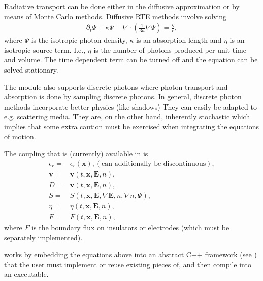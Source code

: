 \documentclass[letterpaper,10pt,english]{sphinxmanual}
\begin{document}
Radiative transport can be done either in the diffusive approximation or by means of Monte Carlo methods.
Diffusive RTE methods involve solving
\begin{equation*}
\begin{split}\partial_t\Psi + \kappa\Psi - \nabla\cdot\left(\frac{1}{3\kappa}\nabla\Psi\right) = \frac{\eta}{c},\end{split}
\end{equation*}
where \(\Psi\) is the isotropic photon density, \(\kappa\) is an absorption length and \(\eta\) is an isotropic source term.
I.e., \(\eta\) is the number of photons produced per unit time and volume.
The time dependent term can be turned off and the equation can be solved stationary.

The module also supports discrete photons where photon transport and absorption is done by sampling discrete photons.
In general, discrete photon methods incorporate better physics (like shadows)
They can easily be adapted to e.g. scattering media.
They are, on the other hand, inherently stochastic which implies that some extra caution must be exercised when integrating the equations of motion.

The coupling that is (currently) available in  is
\begin{equation}\label{equation:Applications/CdrPlasmaModel:CdrPlasmaCoupling}
\begin{split}\epsilon_r =& \epsilon_r(\mathbf{x}), (\textrm{can additionally be discontinuous}), \\
\mathbf{v} =& \mathbf{v}\left(t, \mathbf{x}, \mathbf{E}, n\right),\\
D =& \mathbf{v}\left(t, \mathbf{x}, \mathbf{E}, n\right),\\
S =& S\left(t, \mathbf{x}, \mathbf{E}, \nabla\mathbf{E}, n, \nabla n, \Psi\right),\\
\eta =& \eta\left(t, \mathbf{x}, \mathbf{E}, n\right),\\
F =& F(t, \mathbf{x}, \mathbf{E}, n),\end{split}
\end{equation}
where \(F\) is the boundary flux on insulators or electrodes (which must be separately implemented).

 works by embedding the equations above into an abstract C++ framework (see {\hyperref[\detokenize{Applications/CdrPlasmaModel:chap-cdrplasmaphysics}]{}}) that the user must implement or reuse existing pieces of, and then compile into an executable.
\end{document}
